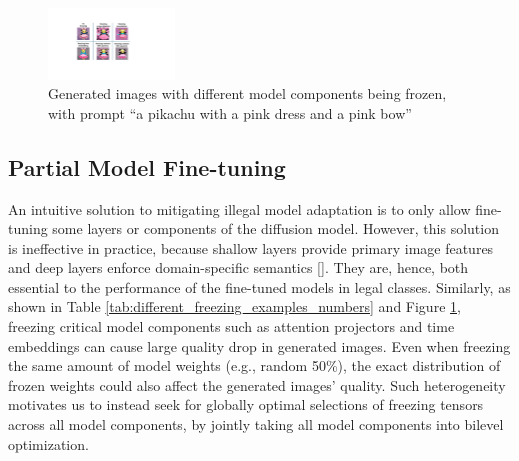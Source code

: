 \documentclass{article}
\begin{document}
\begin{figure}
	\centering
	\vspace{-0.35in}
	\includegraphics[width=0.3\textwidth]{figures/different_freezing_examples.pdf}
	\vspace{-0.1in}
	\caption{Generated images with different model components being frozen, with prompt ``a pikachu with a pink dress and a pink bow''}
	\label{fig:different_freezing_examples_images}
	\vspace{-0.15in}
\end{figure}

\vspace{0.15in}
\subsection{Partial Model Fine-tuning}

An intuitive solution to mitigating illegal model adaptation is to only allow fine-tuning some layers or components of the diffusion model. However, this solution is ineffective in practice, because shallow layers provide primary image features and deep layers enforce domain-specific semantics []. They are, hence, both essential to the performance of the fine-tuned models in legal classes.
Similarly, %
as shown in Table \ref{tab:different_freezing_examples_numbers} and Figure \ref{fig:different_freezing_examples_images}, freezing critical model components such as attention projectors and time embeddings can cause large quality drop in generated images. Even when freezing the same amount of model weights (e.g., random 50\%), the exact distribution of frozen weights could also affect the generated images' quality. Such heterogeneity motivates us to instead seek for globally optimal selections of freezing tensors across all model components, by jointly taking all model components into bilevel optimization.
 
\end{document}
